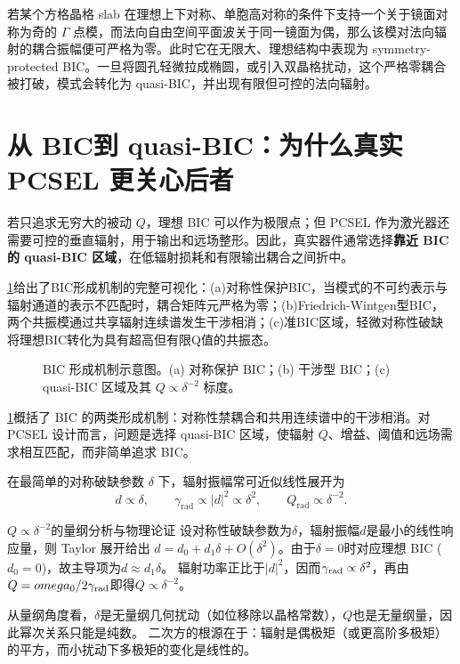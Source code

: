 若某个方格晶格 slab 在理想上下对称、单胞高对称的条件下支持一个关于镜面对称为奇的 $\Gamma$ 点模，而法向自由空间平面波关于同一镜面为偶，那么该模对法向辐射的耦合振幅便可严格为零。此时它在无限大、理想结构中表现为 symmetry-protected BIC。一旦将圆孔轻微拉成椭圆，或引入双晶格扰动，这个严格零耦合被打破，模式会转化为 quasi-BIC，并出现有限但可控的法向辐射。

\section{从 BIC到 quasi-BIC：为什么真实PCSEL 更关心后者}
若只追求无穷大的被动 $Q$，理想 BIC 可以作为极限点；但 PCSEL 作为激光器还需要可控的垂直辐射，用于输出和远场整形。因此，真实器件通常选择\textbf{靠近 BIC 的 quasi-BIC 区域}，在低辐射损耗和有限输出耦合之间折中。

\cref{fig:ch08b_bic_mechanism}给出了BIC形成机制的完整可视化：(a)对称性保护BIC，当模式的不可约表示与辐射通道的表示不匹配时，耦合矩阵元严格为零；(b)Friedrich-Wintgen型BIC，两个共振模通过共享辐射连续谱发生干涉相消；(c)准BIC区域，轻微对称性破缺将理想BIC转化为具有超高但有限Q值的共振态。

\begin{figure}[htbp]
  \centering
  
  \caption{BIC 形成机制示意图。(a) 对称保护 BIC；(b) 干涉型 BIC；(c) quasi-BIC 区域及其 $Q\propto\delta^{-2}$ 标度。}
  \label{fig:ch08b_bic_mechanism}
\end{figure}

\cref{fig:ch08b_bic_mechanism}概括了 BIC 的两类形成机制：对称性禁耦合和共用连续谱中的干涉相消。对 PCSEL 设计而言，问题是选择 quasi-BIC 区域，使辐射 $Q$、增益、阈值和远场需求相互匹配，而非简单追求 BIC。

在最简单的对称破缺参数 $\delta$ 下，辐射振幅常可近似线性展开为
\begin{equation}
d \propto \delta,
\qquad
\gamma_{\mathrm{rad}} \propto |d|^2 \propto \delta^2,
\qquad
Q_{\mathrm{rad}} \propto \delta^{-2}.
\label{eq:q_scaling_quasibic}
\end{equation}

\begin{NoteBox}{$Q\propto\delta^{-2}$的量纲分析与物理论证}
设对称性破缺参数为$\delta$，辐射振幅$d$是最小的线性响应量，则 Taylor 展开给出
$d = d_0 + d_1\delta + O(\delta^2)$。由于$\delta=0$时对应理想 BIC ($d_0=0$)，故主导项为$d\approx d_1\delta$。
辐射功率正比于$|d|^2$，因而$\gamma_{\rm rad}\propto\delta^2$，再由$Q=\omega_0/2\gamma_{\rm rad}$即得$Q\propto\delta^{-2}$。

从量纲角度看，$\delta$是无量纲几何扰动（如位移除以晶格常数），$Q$也是无量纲量，因此幂次关系只能是纯数。
二次方的根源在于：辐射是偶极矩（或更高阶多极矩）的平方，而小扰动下多极矩的变化是线性的。
\end{NoteBox}

